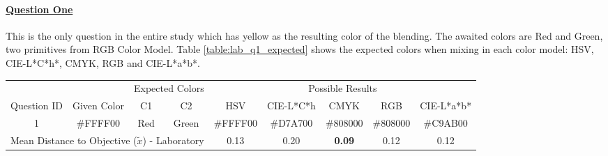 \paragraph{\ul{Question One}}
%
This is the only question in the entire study which has yellow as the resulting color of the blending. The awaited colors are Red and Green, two primitives from RGB Color Model. Table \ref{table:lab_q1_expected} shows the
expected colors when mixing in each color model: HSV, CIE-L*C*h*, CMYK, RGB and CIE-L*a*b*. \par
%
\begin{table}[H]
  \resizebox{\textwidth}{!} {
  \begin{tabular}{@{}ccccccccc@{}}
    \toprule
                                  &                                                       & \multicolumn{2}{c}{Expected Colors}                   & \multicolumn{5}{c}{Possible Results}                                                                                                                                                                                                                                                  \\ \cmidrule(l){3-9}
    \multirow{-2}{*}{Question ID} & \multirow{-2}{*}{Given Color}                         & C1                       & C2                         & HSV                                                   & CIE-L*C*h                                             & CMYK                                                  & RGB                                                   & CIE-L*a*b*                                            \\ \midrule
    \multicolumn{1}{c|}{1}        & \multicolumn{1}{c|}{\cellcolor[HTML]{FFFF00}\#FFFF00} & \multicolumn{1}{c|}{Red} & \multicolumn{1}{c|}{Green} & \multicolumn{1}{c||}{\cellcolor[HTML]{FFFF00}\#FFFF00} & \multicolumn{1}{c||}{\cellcolor[HTML]{D7A700}\#D7A700} & \multicolumn{1}{c||}{\cellcolor[HTML]{808000}\#808000} & \multicolumn{1}{c||}{\cellcolor[HTML]{808000}\#808000} & \multicolumn{1}{c|}{\cellcolor[HTML]{C9AB00}\#C9AB00} \\ \midrule
    \multicolumn{4}{l}{Mean Distance to Objective ($\tilde{x}$) - Laboratory}                                                                                  & 0.13                                                  & 0.20                                                  & \textbf{0.09}                                         & 0.12                                                  & 0.12                                                  \\

\end{tabular}}
\end{table}
